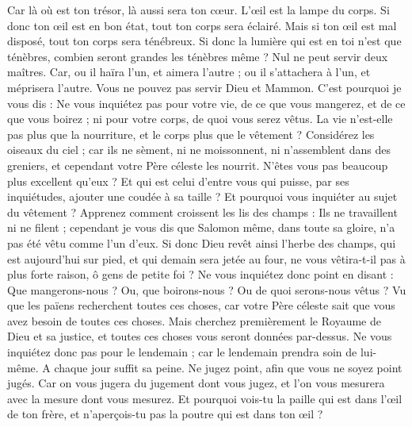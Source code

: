 \begin{multicols}{2}
Car là où est ton trésor, là aussi sera ton cœur.
L’œil est la lampe du corps. Si donc ton œil est en bon état, tout ton corps sera éclairé.
Mais si ton œil est mal disposé, tout ton corps sera ténébreux. Si donc la lumière qui est en toi n'est que ténèbres, combien seront grandes les ténèbres même ?
Nul ne peut servir deux maîtres. Car, ou il haïra l'un, et aimera l'autre ; ou il s'attachera à l'un, et méprisera l'autre. Vous ne pouvez pas servir Dieu et Mammon{}.
C'est pourquoi je vous dis : Ne vous inquiétez pas pour votre vie, de ce que vous mangerez, et de ce que vous boirez ; ni pour votre corps, de quoi vous serez vêtus. La vie n'est-elle pas plus que la nourriture, et le corps plus que le vêtement ?
Considérez les oiseaux du ciel ; car ils ne sèment, ni ne moissonnent, ni n'assemblent dans des greniers, et cependant votre Père céleste les nourrit. N'êtes vous pas beaucoup plus excellent qu'eux ?
Et qui est celui d'entre vous qui puisse, par ses inquiétudes, ajouter une coudée à sa taille ?
Et pourquoi vous inquiéter au sujet du vêtement ? Apprenez comment croissent les lis des champs : Ils ne travaillent ni ne filent ;
cependant je vous dis que Salomon même, dans toute sa gloire, n'a pas été vêtu comme l'un d'eux.
Si donc Dieu revêt ainsi l'herbe des champs, qui est aujourd'hui sur pied, et qui demain sera jetée au four, ne vous vêtira-t-il pas à plus forte raison, ô gens de petite foi ?
Ne vous inquiétez donc point en disant : Que mangerons-nous ? Ou, que boirons-nous ? Ou de quoi serons-nous vêtus ?
Vu que les païens recherchent toutes ces choses, car votre Père céleste sait que vous avez besoin de toutes ces choses.
Mais cherchez premièrement le Royaume de Dieu et sa justice, et toutes ces choses vous seront données par-dessus.
Ne vous inquiétez donc pas pour le lendemain ; car le lendemain prendra soin de lui-même. A chaque jour suffit sa peine.
\VerseOne{}Ne jugez point, afin que vous ne soyez point jugés.
Car on vous jugera du jugement dont vous jugez, et l’on vous mesurera avec la mesure dont vous mesurez.
Et pourquoi vois-tu la paille qui est dans l’œil de ton frère, et n’aperçois-tu pas la poutre qui est dans ton œil ?

\end{multicols}
